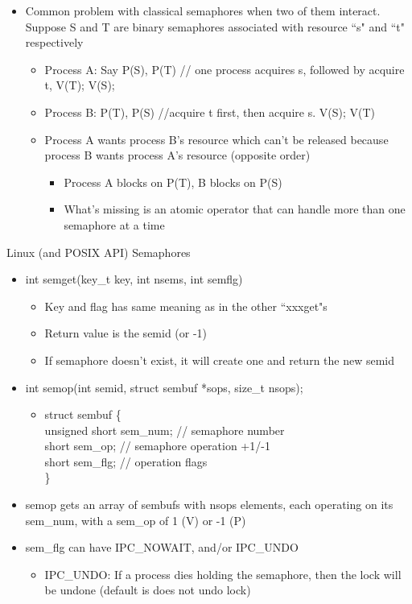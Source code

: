 \begin{itemize}
    \item Common problem with classical semaphores when two of them interact. Suppose S and T are binary semaphores associated with resource ``s" and ``t" respectively
    \begin{itemize}
        \item Process A: Say P(S), P(T) // one process acquires s, followed by acquire t, V(T); V(S);
        \item Process B: P(T), P(S) //acquire t first, then acquire s. V(S); V(T)
        \item Process A wants process B's resource which can't be released because process B wants process A's resource (opposite order)
        \begin{itemize}
            \item Process A blocks on P(T), B blocks on P(S)
            \item What's missing is an atomic operator that can handle more than one semaphore at a time
        \end{itemize}
    \end{itemize}
\end{itemize}
Linux (and POSIX API) Semaphores
\begin{itemize}
    \item int semget(key\_t key, int nsems, int semflg)
    \begin{itemize}
        \item Key and flag has same meaning as in the other ``xxxget"s
        \item Return value is the semid (or -1)
        \item If semaphore doesn't exist, it will create one and return the new semid
    \end{itemize}
    \item int semop(int semid, struct sembuf *sops, size\_t nsops);
    \begin{itemize}
        \item struct sembuf \{\\unsigned short sem\_num; // semaphore number\\short sem\_op; // semaphore operation +1/-1\\short sem\_flg; // operation flags\\\}
    \end{itemize}
    \item semop gets an array of sembufs with nsops elements, each operating on its sem\_num, with a sem\_op of 1 (V) or -1 (P)
    \item sem\_flg can have IPC\_NOWAIT, and/or IPC\_UNDO
    \begin{itemize}
        \item IPC\_UNDO: If a process dies holding the semaphore, then the lock will be undone (default is does not undo lock)
    \end{itemize}
\end{itemize}
